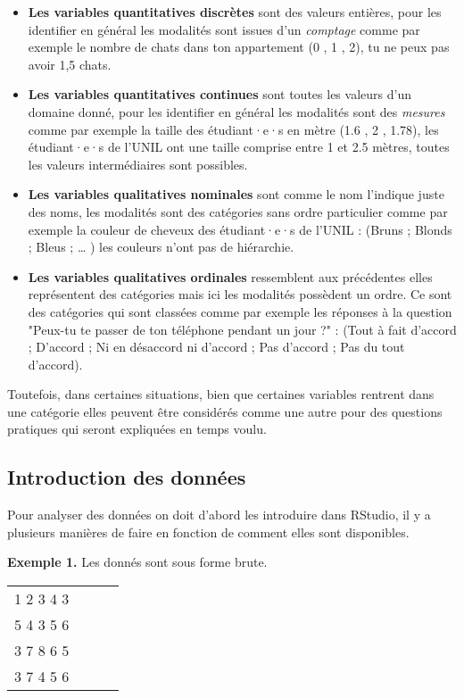 \documentclass{report}
\begin{document}
\begin{itemize}
\item \textbf{Les variables quantitatives discrètes} sont des valeurs entières, pour les identifier en général les modalités sont issues d’un \textit{comptage} comme par exemple le nombre de chats dans ton appartement (0 , 1 , 2), tu ne peux pas avoir 1,5 chats.
\item \textbf{Les variables quantitatives continues} sont toutes les valeurs d’un domaine donné, pour les identifier en général les modalités sont des \textit{mesures} comme par exemple la taille des étudiant·e·s en mètre (1.6 , 2 , 1.78), les étudiant·e·s de l'UNIL ont une taille comprise entre 1 et 2.5 mètres, toutes les valeurs intermédiaires sont possibles.
\item \textbf{Les variables qualitatives nominales} sont comme le nom l’indique juste des noms, les modalités sont des catégories sans ordre particulier comme par exemple la couleur de cheveux des étudiant·e·s de l’UNIL :  (Bruns ; Blonds  ; Bleus  ; … ) les couleurs n’ont pas de hiérarchie.
\item \textbf{Les variables qualitatives ordinales} ressemblent aux précédentes elles représentent des catégories mais ici les modalités possèdent un ordre. Ce sont des catégories qui sont classées comme par exemple les réponses à la question "Peux-tu te passer de ton téléphone pendant un jour ?" : (Tout à fait d'accord ; D'accord ; Ni en désaccord ni d’accord ; Pas d'accord ; Pas du tout d'accord).
\end{itemize}

Toutefois, dans certaines situations, bien que certaines variables rentrent dans une catégorie elles peuvent être considérés comme une autre pour des questions pratiques qui seront expliquées en temps voulu.

\subsection{Introduction des données}

 Pour analyser des données on doit d'abord les introduire dans RStudio, il y a plusieurs manières de faire en fonction de comment elles sont disponibles.

\textbf{Exemple 1.} Les donnés sont sous forme brute. 

\begin{center}
        \begin{tabular}{ c c c c }
            1 2 3 4 3\\
            5 4 3 5 6\\
            3 7 8 6 5\\
            3 7 4 5 6\\
        \end{tabular}
    \end{center}
\end{document}
